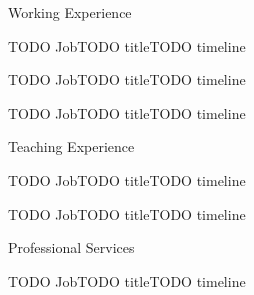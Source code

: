 \documentclass[]{cv}
\begin{document}
\begin{section}{Working Experience}

\begin{subsectionnobullet}{TODO Job}{TODO title}{TODO timeline}
\end{subsectionnobullet}

\begin{subsectionnobullet}{TODO Job}{TODO title}{TODO timeline}
\end{subsectionnobullet}

\begin{subsectionnobullet}{TODO Job}{TODO title}{TODO timeline}
\end{subsectionnobullet}

\end{section}

\begin{section}{Teaching Experience}

\begin{subsectionnobullet}{TODO Job}{TODO title}{TODO timeline}
\end{subsectionnobullet}

\begin{subsectionnobullet}{TODO Job}{TODO title}{TODO timeline}
\end{subsectionnobullet}

\end{section}

\begin{section}{Professional Services}

\begin{subsectionnobullet}{TODO Job}{TODO title}{TODO timeline}
\end{subsectionnobullet}

\end{section}

\end{document}
